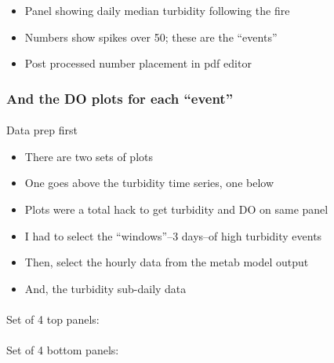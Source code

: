 \documentclass[
  letterpaper,
  DIV=11,
  numbers=noendperiod]{scrartcl}
\makeatletter
\let\oldparagraph\paragraph
\renewcommand{\paragraph}{
    \@ifstar
      \xxxParagraphStar
      \xxxParagraphNoStar
  }
\newcommand{\xxxParagraphStar}[1]{\oldparagraph*{#1}\mbox{}}
\newcommand{\xxxParagraphNoStar}[1]{\oldparagraph{#1}\mbox{}}
\providecommand{\tightlist}{%
  \setlength{\itemsep}{0pt}\setlength{\parskip}{0pt}}\usepackage{longtable,booktabs,array}
\makeatother
\begin{document}
\begin{itemize}
\tightlist
\item
  Panel showing daily median turbidity following the fire
\item
  Numbers show spikes over 50; these are the ``events''
\item
  Post processed number placement in pdf editor
\end{itemize}

\small

\normalsize

\subsubsection{And the DO plots for each
``event''}\label{and-the-do-plots-for-each-event}

\paragraph{Data prep first}\label{data-prep-first}

\begin{itemize}
\tightlist
\item
  There are two sets of plots
\item
  One goes above the turbidity time series, one below
\item
  Plots were a total hack to get turbidity and DO on same panel
\item
  I had to select the ``windows''--3 days--of high turbidity events
\item
  Then, select the hourly data from the metab model output
\item
  And, the turbidity sub-daily data
\end{itemize}

\small

\normalsize

\paragraph{Set of 4 top panels:}\label{set-of-4-top-panels}

\small

\normalsize

\paragraph{Set of 4 bottom panels:}\label{set-of-4-bottom-panels}

\small
\end{document}
